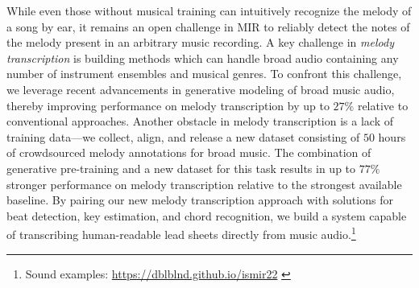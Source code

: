 While even those without musical training can intuitively recognize the melody of a song by ear, 
it remains an open challenge in MIR to reliably detect the notes of the melody present in an arbitrary music recording. 
A key challenge in \emph{melody transcription} is building methods which can handle broad audio containing any number of instrument ensembles and musical genres. 
To confront this challenge, we leverage recent advancements in generative modeling of broad music audio, thereby improving performance on melody transcription by 
up to $27$\% 
relative to conventional approaches. 
Another obstacle in melody transcription is a lack of training data---we collect, align, and release a new dataset consisting of $50$ hours of crowdsourced melody annotations for broad music. 
The combination of generative pre-training and a new dataset for this task results in up to $77\%$ stronger performance on melody transcription relative to the strongest available baseline. 
By pairing our new melody transcription approach with solutions for beat detection, key estimation, and chord recognition, 
we build a system capable of transcribing human-readable lead sheets directly from music audio.\footnote{Sound examples: \url{https://dblblnd.github.io/ismir22} %
\label{sound_examples}}
